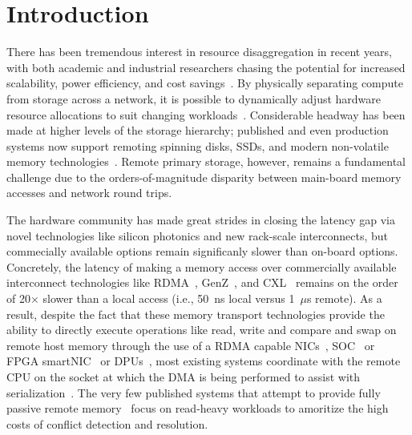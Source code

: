 \section{Introduction}

There has been tremendous interest in resource disaggregation in
recent years, with both academic and industrial researchers chasing
the potential for increased scalability, power efficiency, and cost
savings~\cite{requirements,zombieland,legoos}.  By physically separating compute
from storage across a network, it is possible to dynamically adjust
hardware resource allocations to suit changing
workloads~\cite{fastswap}.  Considerable headway has been made at
higher levels of the storage hierarchy; published and even production
systems now support remoting spinning disks, SSDs, and modern
non-volatile memory technologies~\cite{decible}.  Remote primary
storage, however, remains a fundamental challenge due to the
orders-of-magnitude disparity between main-board memory accesses and
network round trips.



The hardware community has made great strides in closing the latency
gap via novel technologies like silicon photonics and new rack-scale
interconnects, but commecially available options remain significanly
slower than on-board options.  Concretely, the latency of making a
memory access over commercially available interconnect technologies
like RDMA~\cite{infiniband-spec}, GenZ~\cite{genz}, and CXL~\cite{cxl}
remains on the order of 20$\times$ slower than a local access (i.e.,
50~ns local versus 1~$\mu$s remote).  As a result, despite the fact
that these memory transport technologies provide the ability to
directly execute operations like read, write and compare and swap on
remote host memory through the use of a RDMA capable
NICs~\cite{connectx}, SOC~\cite{cavium} or FPGA
smartNIC~\cite{corundum,kv-direct} or DPUs~\cite{fungible}, most
existing systems coordinate with the remote CPU on the socket at which
the DMA is being performed to assist with
serialization~\cite{cliquemap,erpc,herd,sonuma,storm}.  The very few
published systems that attempt to provide fully passive remote
memory~\cite{reigons,clover} focus on read-heavy workloads to
amoritize the high costs of conflict detection and resolution.

